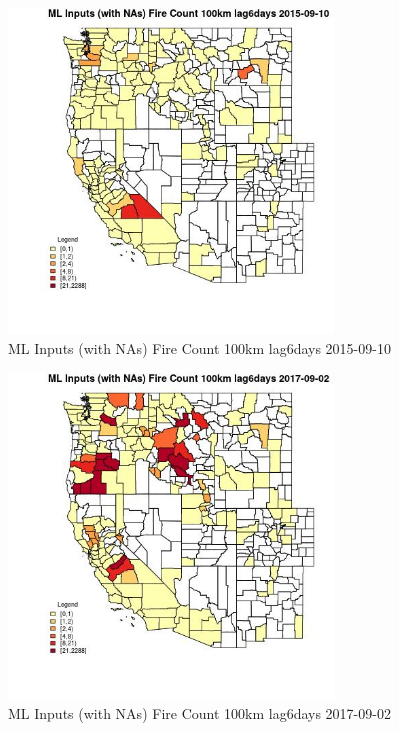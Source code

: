 \begin{figure} 
\centering  
\includegraphics[width=0.77\textwidth]{Code_Outputs/Report_ML_input_PM25_Step4_part_e_de_duplicated_aves_compiled_2019-05-21wNAs_CountyFire_Count_100km_lag6daysMean2015-09-10.jpg} 
\caption{\label{fig:Report_ML_input_PM25_Step4_part_e_de_duplicated_aves_compiled_2019-05-21wNAsCountyFire_Count_100km_lag6daysMean2015-09-10}ML Inputs (with NAs) Fire Count 100km lag6days 2015-09-10} 
\end{figure} 
 

\begin{figure} 
\centering  
\includegraphics[width=0.77\textwidth]{Code_Outputs/Report_ML_input_PM25_Step4_part_e_de_duplicated_aves_compiled_2019-05-21wNAs_CountyFire_Count_100km_lag6daysMean2017-09-02.jpg} 
\caption{\label{fig:Report_ML_input_PM25_Step4_part_e_de_duplicated_aves_compiled_2019-05-21wNAsCountyFire_Count_100km_lag6daysMean2017-09-02}ML Inputs (with NAs) Fire Count 100km lag6days 2017-09-02} 
\end{figure} 
 

